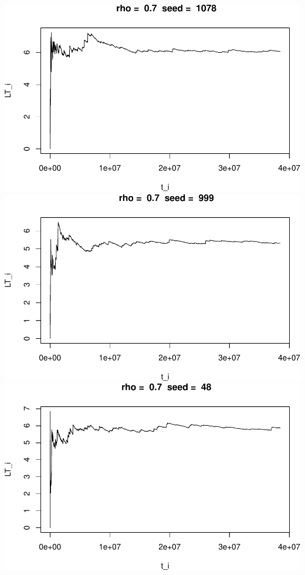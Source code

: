 \documentclass[]{article}
\begin{document}
\includegraphics{003_files/figure-latex/unnamed-chunk-18-4.pdf}
\includegraphics{003_files/figure-latex/unnamed-chunk-18-5.pdf}
\includegraphics{003_files/figure-latex/unnamed-chunk-18-6.pdf}
\end{document}

